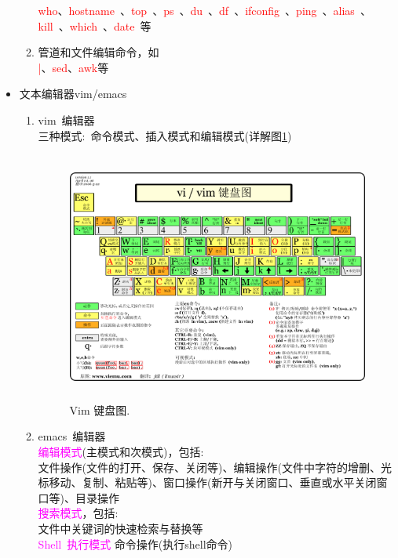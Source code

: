 \documentclass{article}      %
\begin{document}
\begin{itemize}
\begin{enumerate}
				\textcolor{red}{\textrm{who}}、\textcolor{red}{\textrm{hostname~}}、\textcolor{red}{\textrm{top~}}、\textcolor{red}{\textrm{ps~}}、\textcolor{red}{\textrm{du~}}、\textcolor{red}{\textrm{df~}}、\textcolor{red}{\textrm{ifconfig~}}、\textcolor{red}{\textrm{ping~}}、\textcolor{red}{\textrm{alias~}}、\textcolor{red}{\textrm{kill~}}、\textcolor{red}{\textrm{which~}}、\textcolor{red}{\textrm{date~}}等
			\item 管道和文件编辑命令，如\\
				\textcolor{red}{\textrm{|}}、\textcolor{red}{\textrm{sed}}、\textcolor{red}{\textrm{awk}}等
		\end{enumerate}
	\item 文本编辑器vim/emacs
		\begin{enumerate}
			\item \textrm{vim~}编辑器\\
				三种模式:~命令模式、插入模式和编辑模式(详解图\ref{Fig:Vim_Key})
\begin{figure}[h!]
\centering
\includegraphics[height=3.25in,width=5.0in,viewport=0 0 1100 750,clip]{Figures/Vim_Key.png}
\caption{\small \textrm{Vim 键盘图}.}%
\label{Fig:Vim_Key}
\end{figure}
			\item \textrm{emacs~}编辑器\\
				\textcolor{magenta}{编辑模式}(主模式和次模式)，包括:\\
				文件操作(文件的打开、保存、关闭等)、编辑操作(文件中字符的增删、光标移动、复制、粘贴等)、窗口操作(新开与关闭窗口、垂直或水平关闭窗口等)、目录操作\\
				\textcolor{magenta}{搜索模式}，包括:\\
				文件中关键词的快速检索与替换等\\
				\textcolor{magenta}{\textrm{Shell~}执行模式}
				命令操作(执行\textrm{shell}命令)
		\end{enumerate}
\end{itemize}
\end{document}
